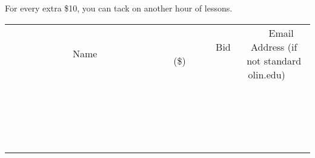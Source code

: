 \documentclass[11pt]{article}
\begin{document}
For every extra \$10, you can tack on another hour of lessons.
\\[3ex]
\begin{tabular}{c c c}
~~~~~~~~~~~~~Name~~~~~~~~~~~~~ & ~~~~~~~~~Bid (\$)~~~~~~~~~  & ~~~Email Address (if not standard olin.edu)~~~\\
 & & \\
\hline
 & & \\
\hline
 & & \\
\hline
 & & \\
\hline
 & & \\
\hline
 & & \\
\hline
 & & \\
\hline
 & & \\
\hline
 & & \\
\hline
 & & \\
\hline
 & & \\
\hline
 & & \\
\hline
 & & \\
\hline
 & & \\
\hline
 & & \\
\hline
 & & \\
\hline
 & & \\
\hline
 & & \\
\hline
 & & \\
\hline
\end{tabular}
\newpage
\end{document}
